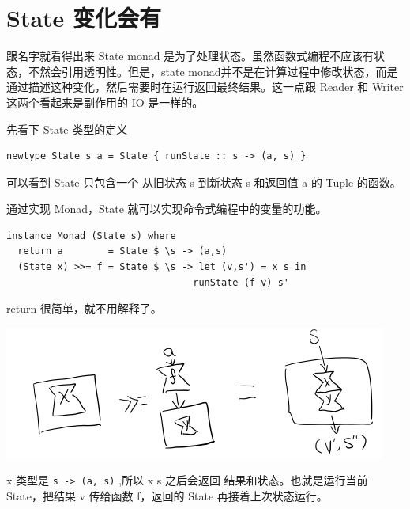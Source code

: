 \documentclass[letterspacing]{tufte-book}
\begin{document}
\chapter{State 变化会有}
\label{sec:org4cf833a}
跟名字就看得出来 State monad 是为了处理状态。虽然函数式编程不应该有状态，不然会引用透明性。但是，state monad并不是在计算过程中修改状态，而是通过描述这种变化，然后需要时在运行返回最终结果。这一点跟 Reader 和 Writer 这两个看起来是副作用的 IO 是一样的。

先看下 State 类型的定义
\lstset{language=haskell,label= ,caption= ,captionpos=b,numbers=none}
\begin{lstlisting}
newtype State s a = State { runState :: s -> (a, s) }
\end{lstlisting}

可以看到 State 只包含一个 从旧状态 s 到新状态 s 和返回值 a 的 Tuple 的函数。

通过实现 Monad，State 就可以实现命令式编程中的变量的功能。
\lstset{language=haskell,label= ,caption= ,captionpos=b,numbers=none}
\begin{lstlisting}
instance Monad (State s) where
  return a        = State $ \s -> (a,s)
  (State x) >>= f = State $ \s -> let (v,s') = x s in
                                 runState (f v) s'
\end{lstlisting}
return 很简单，就不用解释了。

\begin{center}
\includegraphics[width=.9\linewidth]{images/p2-state-monad.png}
\end{center}

x 类型是 \texttt{s -> (a, s)} ,所以 x s 之后会返回 结果和状态。也就是运行当前 State，把结果 v 传给函数 f，返回的 State 再接着上次状态运行。
\end{document}
